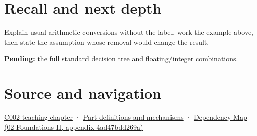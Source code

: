 \section{Recall and next depth}\label{appendix-5e2d663adf7f-recall-and-next-depth}

Explain usual arithmetic conversions without the label, work the example above, then state the assumption whose removal would change the result.

\textbf{Pending:} the full standard decision tree and floating/integer combinations.

\section{Source and navigation}\label{appendix-5e2d663adf7f-source-and-navigation}

\href{Continuous\%20Notes/Computing\%20Foundations\%20-\%20From\%20Bits\%20to\%20C++\%20and\%20Systems\%20APIs\#Arithmetic\%20becomes\%20a\%20policy}{C002 teaching chapter} · \hyperref[appendix-fd090d982a15]{Part definitions and mechanisms} · \href{../02-Foundations-II/main.pdf\#nameddest=appendix-4ad47bdd269a}{Dependency Map (02-Foundations-II, appendix-4ad47bdd269a)}
